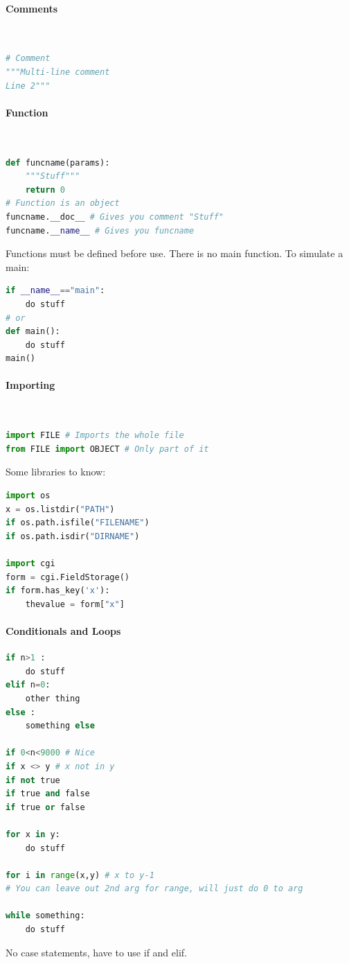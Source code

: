 \documentclass[12 pt]{article}
\begin{document}
\paragraph{Comments}~
\begin{lstlisting}[language=python]
# Comment
"""Multi-line comment
Line 2"""
\end{lstlisting}
\paragraph{Function}~
\begin{lstlisting}[language=python]
def funcname(params):
    """Stuff"""
    return 0
# Function is an object
funcname.__doc__ # Gives you comment "Stuff"
funcname.__name__ # Gives you funcname
\end{lstlisting}
Functions must be defined before use. There is no main function. To simulate a main:
\begin{lstlisting}[language=python]
if __name__=="main":
    do stuff
# or
def main():
    do stuff
main()
\end{lstlisting}
\paragraph{Importing}~
\begin{lstlisting}[language=python]
import FILE # Imports the whole file
from FILE import OBJECT # Only part of it
\end{lstlisting}
Some libraries to know:
\begin{lstlisting}[language=python]
import os
x = os.listdir("PATH")
if os.path.isfile("FILENAME")
if os.path.isdir("DIRNAME")

import cgi
form = cgi.FieldStorage()
if form.has_key('x'):
    thevalue = form["x"]
\end{lstlisting}
\paragraph{Conditionals and Loops}
\begin{lstlisting}[language=python]
if n>1 :
    do stuff
elif n=0:
    other thing
else :
    something else

if 0<n<9000 # Nice
if x <> y # x not in y
if not true
if true and false
if true or false

for x in y:
    do stuff

for i in range(x,y) # x to y-1
# You can leave out 2nd arg for range, will just do 0 to arg

while something:
    do stuff
\end{lstlisting}
No case statements, have to use if and elif.
\end{document}
